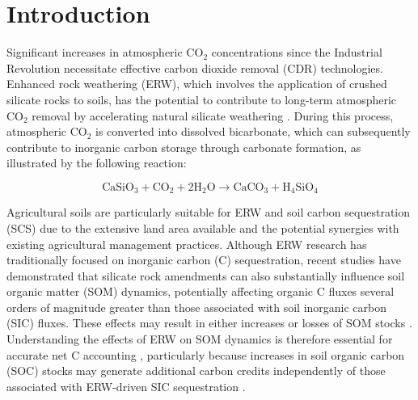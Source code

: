 \documentclass[preprint,12pt]{elsarticle}
\begin{document}

\section{Introduction}
\label{sec:introduction}

Significant increases in atmospheric CO$_2$ concentrations since the Industrial Revolution necessitate effective carbon dioxide removal (CDR) technologies. Enhanced rock weathering (ERW), which involves the application of crushed silicate rocks to soils, has the potential to contribute to long-term atmospheric CO$_2$ removal by accelerating natural silicate weathering \citep{Hartmann2008,manning2024soil}. During this process, atmospheric CO$_2$ is converted into dissolved bicarbonate, which can subsequently contribute to inorganic carbon storage through carbonate formation, as illustrated by the following reaction:

\begin{equation}
    \mathrm{CaSiO_3 + CO_2 + 2H_2O
    \rightarrow CaCO_3 + H_4SiO_4}
    \label{eq:carbonation}
\end{equation}

Agricultural soils are particularly suitable for ERW and soil carbon sequestration (SCS) due to the extensive land area available and the potential synergies with existing agricultural management practices. Although ERW research has traditionally focused on inorganic carbon (C) sequestration, recent studies have demonstrated that silicate rock amendments can also substantially influence soil organic matter (SOM) dynamics, potentially affecting organic C fluxes several orders of magnitude greater than those associated with soil inorganic carbon (SIC) fluxes. These effects may result in either increases or losses of SOM stocks \citep{Vicca2022, steinwidder2025beyond,sokol2024reduced}. Understanding the effects of ERW on SOM dynamics is therefore essential for accurate net C accounting \citep{Niron2024}, particularly because increases in soil organic carbon (SOC) stocks may generate additional carbon credits independently of those associated with ERW-driven SIC sequestration \citep{manning2024soil}.
\end{document}
